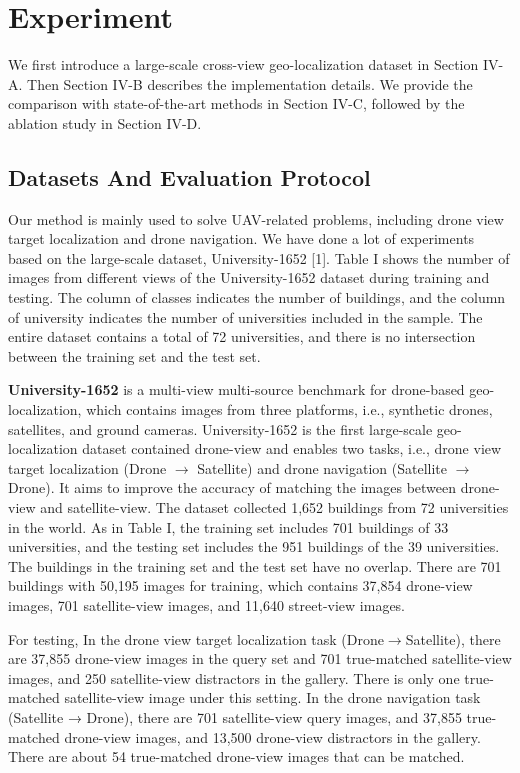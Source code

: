 \documentclass[lettersize,journal]{IEEEtran}
\begin{document}
\section{Experiment}
We first introduce a large-scale cross-view geo-localization dataset in Section IV-A. Then Section IV-B describes the implementation details. We provide the comparison with state-of-the-art methods in Section IV-C, followed by the ablation study in Section IV-D. 

\subsection{Datasets And Evaluation Protocol}

Our method is mainly used to solve UAV-related problems, including drone view target localization and drone navigation. We have done a lot of experiments based on the large-scale dataset, University-1652 [1]. Table I shows the number of images from different views of the University-1652 dataset during training and testing. The column of classes indicates the number of buildings, and the column of university indicates the number of universities included in the sample. The entire dataset contains a total of 72 universities, and there is no intersection between the training set and the test set.


\textbf{University-1652} is a multi-view multi-source benchmark for drone-based geo-localization, which contains images from three platforms, i.e., synthetic drones, satellites, and ground cameras. University-1652 is the first large-scale geo-localization dataset contained drone-view and enables two tasks, i.e., drone view target localization (Drone $\rightarrow$ Satellite) and drone navigation (Satellite $\rightarrow$ Drone). It aims to improve the accuracy of matching the images between drone-view and satellite-view. The dataset collected 1,652 buildings from 72 universities in the world. As in Table I, the training set includes 701 buildings of 33 universities, and the testing set includes the 951 buildings of the 39 universities. The buildings in the training set and the test set have no overlap. There are 701 buildings with 50,195 images for training, which contains 37,854 drone-view images, 701 satellite-view images, and 11,640 street-view images. 

For testing, In the drone view target localization task (Drone$\rightarrow$Satellite), there are 37,855 drone-view images in the query set and 701 true-matched satellite-view images, and 250 satellite-view distractors in the gallery. There is only one true-matched satellite-view image under this setting. In the drone navigation task (Satellite → Drone), there are 701 satellite-view query images, and 37,855 true-matched drone-view images, and 13,500 drone-view distractors in the gallery. There are about 54 true-matched drone-view images that can be matched. 
\end{document}
